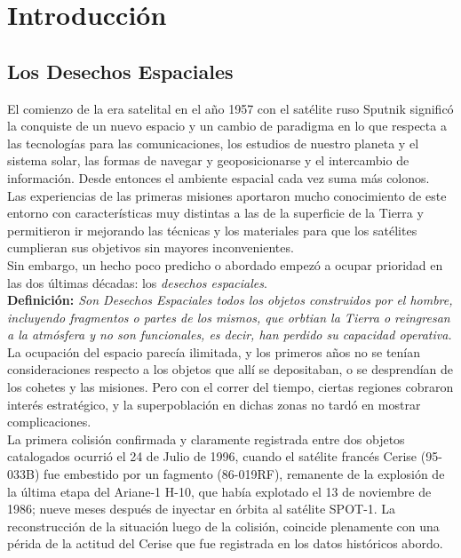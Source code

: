 \chapter{Introducción}
\label{chap:introduccion}


\section{Los Desechos Espaciales}

El comienzo de la era satelital en el a\~no 1957 con el sat\'elite ruso Sputnik signific\'o la conquiste de un nuevo espacio y un cambio de paradigma en lo que respecta a las tecnolog\'ias para las comunicaciones, los estudios de nuestro planeta y el sistema solar, las formas de navegar y geoposicionarse y el intercambio de informaci\'on. Desde entonces el ambiente espacial cada vez suma m\'as colonos.\\

Las experiencias de las primeras misiones aportaron mucho conocimiento de este entorno con caracter\'isticas muy distintas a las de la superficie de la Tierra y permitieron ir mejorando las t\'ecnicas y los materiales para que los sat\'elites cumplieran sus objetivos sin mayores inconvenientes.\\
Sin embargo, un hecho poco predicho o abordado empez\'o a ocupar prioridad en las dos \'ultimas d\'ecadas: los {\it{desechos espaciales}}.\\

{\bf{Definici\'on:}}{\it{ Son Desechos Espaciales todos los objetos construidos por el hombre, incluyendo fragmentos o partes de los mismos, que orbtian la Tierra o reingresan a la atm\'osfera y no son funcionales, es decir, han perdido su capacidad operativa.}} \citep{iadcguide}\\

La ocupaci\'on del espacio parec\'ia ilimitada, y los primeros a\~nos no se ten\'ian consideraciones respecto a los objetos que all\'i se depositaban, o se desprend\'ian de los cohetes y las misiones. Pero con el correr del tiempo, ciertas regiones cobraron inter\' es estrat\'egico, y la superpoblaci\' on en dichas zonas no tard\'o en mostrar complicaciones.\\

La primera colisi\'on confirmada y claramente registrada entre dos objetos catalogados ocurri\'o el 24 de Julio de 1996, cuando el sat\'elite franc\'es Cerise (95-033B) fue embestido por un fagmento (86-019RF), remanente de la explosi\'on de la \'ultima etapa del Ariane-1 H-10, que hab\'ia explotado el 13 de noviembre de 1986; nueve meses despu\'es de inyectar en \'orbita al sat\'elite SPOT-1. La reconstrucci\'on de la situaci\'on luego de la colisi\'on, coincide plenamente con una p\'erida de la actitud del Cerise que fue registrada en los datos hist\'oricos abordo. \citep{KlinkradChapter8}\\


